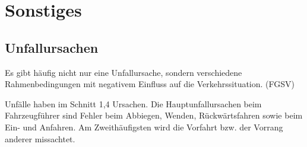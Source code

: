 \section{Sonstiges}




\subsection{Unfallursachen}

Es gibt häufig nicht nur eine Unfallursache, sondern verschiedene Rahmenbedingungen mit negativem Einfluss auf die Verkehrssituation. (FGSV)

Unfälle haben im Schnitt 1,4 Ursachen. Die Hauptunfallursachen beim Fahrzeugführer sind Fehler beim Abbiegen, Wenden, Rückwärtsfahren sowie beim Ein- und Anfahren. Am Zweithäufigsten wird die Vorfahrt bzw. der Vorrang anderer missachtet. \parencite[S.149]{StatistischesBundesamt.2016}